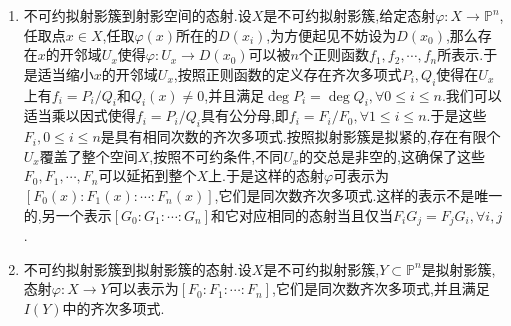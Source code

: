 \begin{enumerate}
\begin{proof}
    	设$\varphi(x)$在$D(x_i)$中的坐标表示为$(y_0,\cdots,\hat{y_i},\cdots,y_n)$.如果$\varphi(x)$也落在$D(x_j)$中,$\varphi(x)$此时的坐标表示为$(z_0,\cdots,\hat{z_j},\cdots,z_n)$,其中$k\not=i,j$的时候$z_k=y_0/y_j$,而$z_j=1/y_j$.于是如果$\varphi$限制在$U\to D(x_i)\cong\mathbb{A}^n$的坐标表示为$(s_0,\cdots,\hat{s_i},\cdots,s_n)$,那么它限制在$U\to D(x_j)\cong\mathbb{A}^n$的坐标表示为$(t_0,\cdots,\hat{t_j},\cdots,t_n)$,其中$k\not=i,j$的时候$g_k=f_0/f_j$,而$g_j=1/f_j$.于是适当选取$x$更小的开邻域$U'\subseteq U$使得$f_j$在其上不取零,此时这些分量都是$X$上的正则函数,于是它也是正则映射.
    \end{proof}
    \item 不可约拟射影簇到射影空间的态射.设$X$是不可约拟射影簇,给定态射$\varphi:X\to\mathbb{P}^n$,任取点$x\in X$,任取$\varphi(x)$所在的$D(x_i)$,为方便起见不妨设为$D(x_0)$,那么存在$x$的开邻域$U_x$使得$\varphi:U_x\to D(x_0)$可以被$n$个正则函数$f_1,f_2,\cdots,f_n$所表示.于是适当缩小$x$的开邻域$U_x$,按照正则函数的定义存在齐次多项式$P_i,Q_i$使得在$U_x$上有$f_i=P_i/Q_i$和$Q_i(x)\not=0$,并且满足$\deg P_i=\deg Q_i,\forall 0\le i\le n$.我们可以适当乘以因式使得$f_i=P_i/Q_i$具有公分母,即$f_i=F_i/F_0,\forall 1\le i\le n$.于是这些$F_i,0\le i\le n$是具有相同次数的齐次多项式.按照拟射影簇是拟紧的,存在有限个$U_x$覆盖了整个空间$X$,按照不可约条件,不同$U_x$的交总是非空的,这确保了这些$F_0,F_1,\cdots,F_n$可以延拓到整个$X$上.于是这样的态射$\varphi$可表示为$[F_0(x):F_1(x):\cdots:F_n(x)]$,它们是同次数齐次多项式.这样的表示不是唯一的,另一个表示$[G_0:G_1:\cdots:G_n]$和它对应相同的态射当且仅当$F_iG_j=F_jG_i,\forall i,j$.
    \item 不可约拟射影簇到拟射影簇的态射.设$X$是不可约拟射影簇,$Y\subset\mathbb{P}^n$是拟射影簇,态射$\varphi:X\to Y$可以表示为$[F_0:F_1:\cdots:F_n]$,它们是同次数齐次多项式,并且满足$I(Y)$中的齐次多项式.
\end{enumerate}

